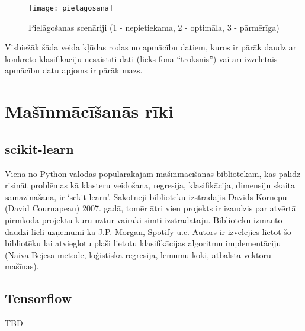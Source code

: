 \begin{figure}[H]
	\texttt{[image: pielagosana]}
	\caption{Pielāgošanas scenāriji (1 - nepietiekama, 2 - optimāla, 3 - pārmērīga)}
	\label{fig:pielagosana}
\end{figure}
 
Visbiežāk šāda veida kļūdas rodas no apmācību datiem, kuros ir pārāk daudz ar konkrēto klasifikāciju nesaistīti dati (lieks fona “troksnis”) vai arī izvēlētais apmācību datu apjoms ir pārāk mazs.

\newpage
\section{Mašīnmācīšanās rīki}
\subsection{scikit-learn}
Viena no Python valodas populārākajām mašīnmācīšanās bibliotēkām, kas palīdz risināt problēmas kā klasteru veidošana, regresija, klasifikācija, dimensiju skaita samazināšana, ir ‘sckit-learn’. Sākotnēji bibliotēku izstrādājis Dāvids Kornepū (David Cournapeau) 2007. gadā, tomēr ātri vien projekts ir izaudzis par atvērtā pirmkoda projektu kuru uztur vairāki simti izstrādātāju.  Bibliotēku izmanto daudzi lieli uzņēmumi kā J.P. Morgan, Spotify u.c. Autors ir izvēlējies lietot šo bibliotēku lai atvieglotu plaši lietotu klasifikācijas algoritmu implementāciju (Naivā Bejesa metode, loģistiskā regresija, lēmumu koki,  atbalsta vektoru mašīnas). 
\subsection{Tensorflow}
TBD
